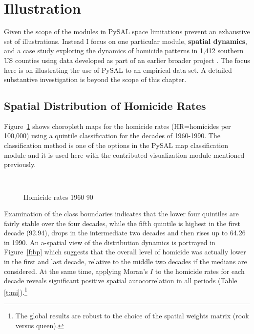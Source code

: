 \documentclass[11pt, titlepage]{amsart}
\begin{document}
\section{Illustration}

Given the scope of the modules in PySAL space limitations prevent an
exhaustive set of illustrations. Instead I focus on one particular
module, \textbf{spatial dynamics}, and a case study exploring the dynamics of
homicide patterns in  1,412 southern US counties using data developed as
part of an earlier broader project \citep{Baller:2001aa,
Messner:1999oq}. The focus here is on illustrating the use of PySAL to
an empirical data set. A detailed substantive investigation is beyond
the scope of this chapter.

\subsection{Spatial Distribution of Homicide Rates}

Figure~\ref{f:hr} shows choropleth maps for the homicide rates
(HR=homicides per 100,000) using a quintile classification for the
decades of 1960-1990. The classification method is one of the options in
the PySAL map classification module and it is used here with the
contributed visualization module mentioned previously.


\begin{figure}
  \centering
  \\
  \noindent
\caption[caption]{Homicide rates 1960-90}
\label{f:hr}
\end{figure}


Examination of the class boundaries indicates that the lower four
quintiles are fairly stable over the four decades, while the fifth
quintile
is highest in the first decade (92.94), drops in the intermediate two
decades and then rises up to 64.26 in 1990. An a-spatial view of the
distribution dynamics is portrayed in Figure~\ref{f:bp} which suggests that the overall level
of homicide was actually lower in the first and last decade, relative to
the middle two decades if the medians are considered.
At the same time, applying Moran's $I$ to the homicide rates for each decade reveals
significant positive spatial autocorrelation  in
all periods (Table \ref{t:mi}).\footnote{The global
results are robust to the choice of the spatial weights matrix (rook
versus queen).}
\end{document}
